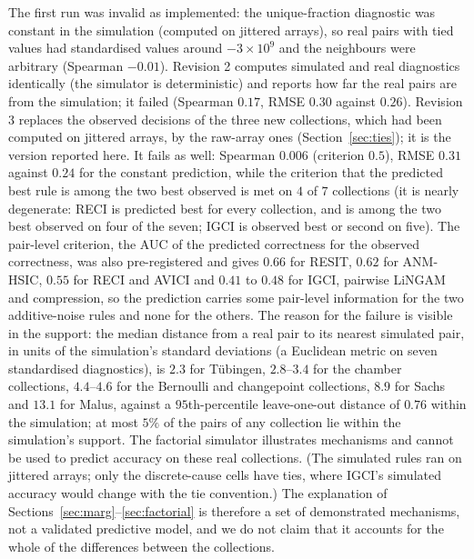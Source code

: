 The first run was invalid as implemented: the unique-fraction diagnostic was constant in the simulation (computed on jittered arrays), so real pairs with tied values had standardised values around $-3\times10^{9}$ and the neighbours were arbitrary (Spearman $-0.01$). Revision 2 computes simulated and real diagnostics identically (the simulator is deterministic) and reports how far the real pairs are from the simulation; it failed (Spearman $0.17$, RMSE $0.30$ against $0.26$). Revision 3 replaces the observed decisions of the three new collections, which had been computed on jittered arrays, by the raw-array ones (Section~\ref{sec:ties}); it is the version reported here. It fails as well: Spearman $0.006$ (criterion $0.5$), RMSE $0.31$ against $0.24$ for the constant prediction, while the criterion that the predicted best rule is among the two best observed is met on $4$ of $7$ collections (it is nearly degenerate: RECI is predicted best for every collection, and is among the two best observed on four of the seven; IGCI is observed best or second on five). The pair-level criterion, the AUC of the predicted correctness for the observed correctness, was also pre-registered and gives $0.66$ for RESIT, $0.62$ for ANM-HSIC, $0.55$ for RECI and AVICI and $0.41$ to $0.48$ for IGCI, pairwise LiNGAM and compression, so the prediction carries some pair-level information for the two additive-noise rules and none for the others. The reason for the failure is visible in the support: the median distance from a real pair to its nearest simulated pair, in units of the simulation's standard deviations (a Euclidean metric on seven standardised diagnostics), is $2.3$ for T\"ubingen, $2.8$--$3.4$ for the chamber collections, $4.4$--$4.6$ for the Bernoulli and changepoint collections, $8.9$ for Sachs and $13.1$ for Malus, against a $95$th-percentile leave-one-out distance of $0.76$ within the simulation; at most $5\%$ of the pairs of any collection lie within the simulation's support. The factorial simulator illustrates mechanisms and cannot be used to predict accuracy on these real collections. (The simulated rules ran on jittered arrays; only the discrete-cause cells have ties, where IGCI's simulated accuracy would change with the tie convention.) The explanation of Sections~\ref{sec:marg}--\ref{sec:factorial} is therefore a set of demonstrated mechanisms, not a validated predictive model, and we do not claim that it accounts for the whole of the differences between the collections.


